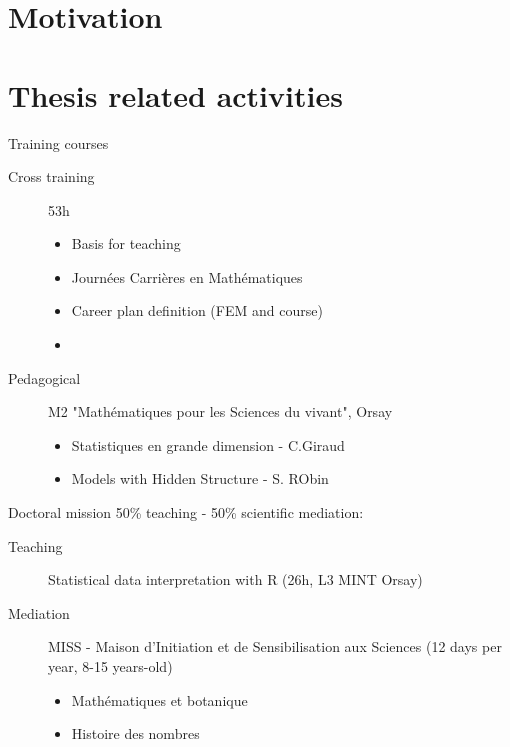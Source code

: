 \documentclass[9pt]{beamer}
\begin{document}
\section{Motivation}
\section{Thesis related activities}
\begin{frame}{Training courses}
    \begin{description}
    \item[Cross training]53h\begin{itemize}
    
        \item Basis for teaching
        \item Journées Carrières en Mathématiques
        \item Career plan definition (FEM and course)
        \item[]
    \end{itemize}
    \item[Pedagogical] M2 "Mathématiques pour les Sciences du vivant", Orsay\begin{itemize}
        
        \item Statistiques en grande dimension - C.Giraud
        \item Models with Hidden Structure - S. RObin
    \end{itemize}
    \end{description}
\end{frame}
\begin{frame}{Doctoral mission}
    50\% teaching - 50\% scientific mediation:\\\vspace{1cm}
    
    \begin{description}
    \item[Teaching] Statistical data interpretation with R (26h, L3 MINT Orsay)\bigskip
    \item[Mediation] MISS - Maison d'Initiation et de Sensibilisation aux Sciences (12 days per year, 8-15 years-old)
    \begin{itemize}
    \item Mathématiques et botanique
    \item Histoire des nombres
    \end{itemize}
    
    \end{description}
\end{frame}
\end{document}
